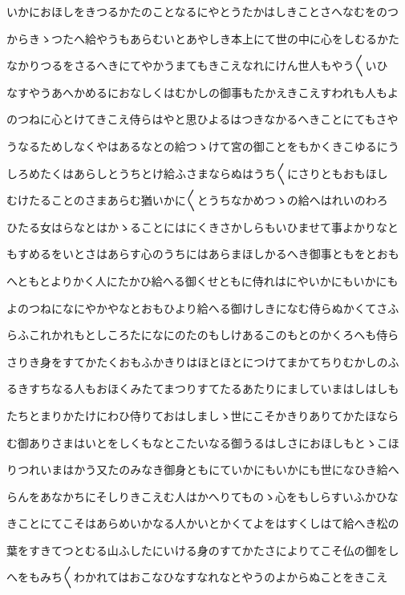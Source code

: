 \documentclass[a4paper,11pt,landscape]{ltjtarticle}
\begin{document}
いかにおほしをきつるかたのことなるにやとうたかはしきことさへなむをのつ
\par\medskip
からきゝつたへ給やうもあらむいとあやしき本上にて世の中に心をしむるかた
\par\medskip
なかりつるをさるへきにてやかうまてもきこえなれにけん世人もやう〱いひ
\par\medskip
なすやうあへかめるにおなしくはむかしの御事もたかえきこえすわれも人もよ
\par\medskip
のつねに心とけてきこえ侍らはやと思ひよるはつきなかるへきことにてもさや
\par\medskip
うなるためしなくやはあるなとの給つゝけて宮の御ことをもかくきこゆるにう
\par\medskip
しろめたくはあらしとうちとけ給ふさまならぬはうち〱にさりともおもほし
\par\medskip
むけたることのさまあらむ猶いかに〱とうちなかめつゝの給へはれいのわろ
\par\medskip
ひたる女はらなとはかゝることにはにくきさかしらもいひませて事よかりなと
\par\medskip
もすめるをいとさはあらす心のうちにはあらまほしかるへき御事ともをとおも
\par\medskip
へともとよりかく人にたかひ給へる御くせともに侍れはにやいかにもいかにも
\par\medskip
よのつねになにやかやなとおもひより給へる御けしきになむ侍らぬかくてさふ
\par\medskip
らふこれかれもとしころたになにのたのもしけあるこのもとのかくろへも侍ら
\par\medskip
さりき身をすてかたくおもふかきりはほとほとにつけてまかてちりむかしのふ
\par\medskip
るきすちなる人もおほくみたてまつりすてたるあたりにましていまはしはしも
\par\medskip
たちとまりかたけにわひ侍りておはしましゝ世にこそかきりありてかたほなら
\par\medskip
む御ありさまはいとをしくもなとこたいなる御うるはしさにおほしもとゝこほ
\par\medskip
りつれいまはかう又たのみなき御身ともにていかにもいかにも世になひき給へ
\par\medskip
らんをあなかちにそしりきこえむ人はかへりてものゝ心をもしらすいふかひな
\par\medskip
きことにてこそはあらめいかなる人かいとかくてよをはすくしはて給へき松の
\par\medskip
葉をすきてつとむる山ふしたにいける身のすてかたさによりてこそ仏の御をし
\par\medskip
へをもみち〱わかれてはおこなひなすなれなとやうのよからぬことをきこえ
\end{document}
